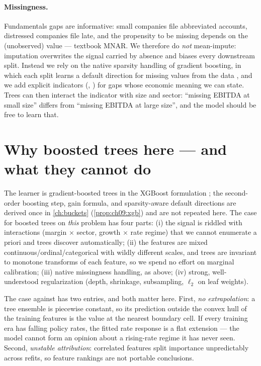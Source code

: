 \paragraph{Missingness.} Fundamentals gaps are informative: small companies file abbreviated
accounts, distressed companies file late, and the propensity to be missing depends on the
(unobserved) value --- textbook MNAR. We therefore do \emph{not} mean-impute: imputation
overwrites the signal carried by absence and biases every downstream split. Instead we rely on
the native sparsity handling of gradient boosting, in which each split learns a default
direction for missing values from the data \citep{chenguestrin2016}, and we add explicit
indicators (, ) for gaps whose economic
meaning we can state. Trees can then interact the indicator with size and sector: ``missing
EBITDA at small size'' differs from ``missing EBITDA at large size'', and the model should be
free to learn that.

\section{Why boosted trees here --- and what they cannot do}\label{cheu:sec:why}

The learner is gradient-boosted trees in the XGBoost formulation
\citep{chenguestrin2016,friedman2001}; the second-order boosting step, gain formula, and
sparsity-aware default directions are derived once in \cref{ch:buckets} (\cref{prop:ch09:xgb})
and are not repeated here. The case for boosted trees on \emph{this} problem has four parts:
(i) the signal is riddled with interactions (margin $\times$ sector, growth $\times$ rate
regime) that we cannot enumerate a priori and trees discover automatically; (ii) the features
are mixed continuous/ordinal/categorical with wildly different scales, and trees are invariant
to monotone transforms of each feature, so we spend no effort on marginal calibration; (iii)
native missingness handling, as above; (iv) strong, well-understood regularization (depth,
shrinkage, subsampling, $\ell_2$ on leaf weights).

The case against has two entries, and both matter here. First, \emph{no extrapolation}: a tree
ensemble is piecewise constant, so its prediction outside the convex hull of the training
features is the value at the nearest boundary cell. If every training era has falling policy
rates, the fitted rate response is a flat extension --- the model cannot form an opinion about
a rising-rate regime it has never seen. Second, \emph{unstable attribution}: correlated
features split importance unpredictably across refits, so feature rankings are not portable
conclusions.

